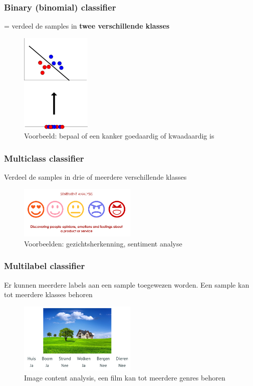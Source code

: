\documentclass{article}
\begin{document}
\subsubsection{Binary (binomial) classifier}

= verdeel de samples in \textbf{twee verschillende klasses}

\begin{figure}[H]
    \centering
    \includegraphics[width=0.3\textwidth]{binary-class.png}
    \caption{Voorbeeld: bepaal of een kanker goedaardig of kwaadaardig is}
\end{figure}

\subsubsection{Multiclass classifier}

Verdeel de samples in drie of meerdere verschillende klasses

\begin{figure}[H]
    \centering
    \includegraphics[width=0.5\textwidth]{multiclass-classifier.png}
    \caption{Voorbeelden: gezichtsherkenning, sentiment analyse}
\end{figure}

\subsubsection{Multilabel classifier}

Er kunnen meerdere labels aan een sample toegewezen worden. 
Een sample kan tot meerdere klasses behoren

\begin{figure}[H]
    \centering
    \includegraphics[width=0.5\textwidth]{multilabel-classifier.png}
    \caption{Image content analysis, een film kan tot meerdere genres behoren}
\end{figure}
\end{document}
